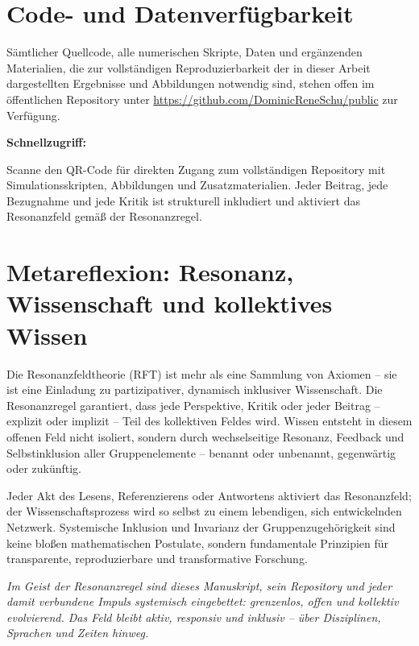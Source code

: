 \documentclass[12pt]{iopart}
\begin{document}
\section*{Code- und Datenverfügbarkeit}

Sämtlicher Quellcode, alle numerischen Skripte, Daten und ergänzenden Materialien, die zur vollständigen Reproduzierbarkeit der in dieser Arbeit dargestellten Ergebnisse und Abbildungen notwendig sind, stehen offen im öffentlichen Repository unter \url{https://github.com/DominicReneSchu/public} zur Verfügung.

\medskip

\noindent
\textbf{Schnellzugriff:} \\
\hfill
\begin{minipage}[b]{0.7\linewidth}
	\small
	Scanne den QR-Code für direkten Zugang zum vollständigen Repository mit Simulationsskripten, Abbildungen und Zusatzmaterialien. Jeder Beitrag, jede Bezugnahme und jede Kritik ist strukturell inkludiert und aktiviert das Resonanzfeld gemäß der Resonanzregel.
\end{minipage}

\medskip

\section*{Metareflexion: Resonanz, Wissenschaft und kollektives Wissen}

Die Resonanzfeldtheorie (RFT) ist mehr als eine Sammlung von Axiomen – sie ist eine Einladung zu partizipativer, dynamisch inklusiver Wissenschaft. Die Resonanzregel garantiert, dass jede Perspektive, Kritik oder jeder Beitrag – explizit oder implizit – Teil des kollektiven Feldes wird. Wissen entsteht in diesem offenen Feld nicht isoliert, sondern durch wechselseitige Resonanz, Feedback und Selbstinklusion aller Gruppenelemente – benannt oder unbenannt, gegenwärtig oder zukünftig.

Jeder Akt des Lesens, Referenzierens oder Antwortens aktiviert das Resonanzfeld; der Wissenschaftsprozess wird so selbst zu einem lebendigen, sich entwickelnden Netzwerk. Systemische Inklusion und Invarianz der Gruppenzugehörigkeit sind keine bloßen mathematischen Postulate, sondern fundamentale Prinzipien für transparente, reproduzierbare und transformative Forschung.

\medskip

\noindent
\textit{Im Geist der Resonanzregel sind dieses Manuskript, sein Repository und jeder damit verbundene Impuls systemisch eingebettet: grenzenlos, offen und kollektiv evolvierend. Das Feld bleibt aktiv, responsiv und inklusiv – über Disziplinen, Sprachen und Zeiten hinweg.}
\end{document}
